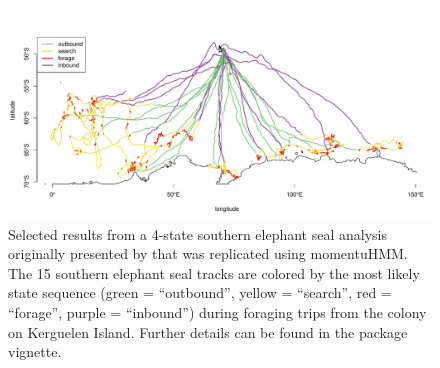 \documentclass[12pt]{article}\usepackage[]{graphicx}\usepackage[]{color}
\begin{document}
\begin{figure}[htbp]
  \centering
  \includegraphics[width=\textwidth]{plot_sesResults2}
  \caption{Selected results from a 4-state southern elephant seal analysis originally presented by \cite{MichelotEtAl2017} that was replicated using momentuHMM. The 15 southern elephant seal tracks are colored by the most likely state sequence (green = ``outbound'', yellow = ``search'', red = ``forage'', purple = ``inbound'') during foraging trips from the colony on Kerguelen Island. Further details can be found in the package vignette.}
  \label{fig:sesTracks}
\end{figure}
\end{document}
